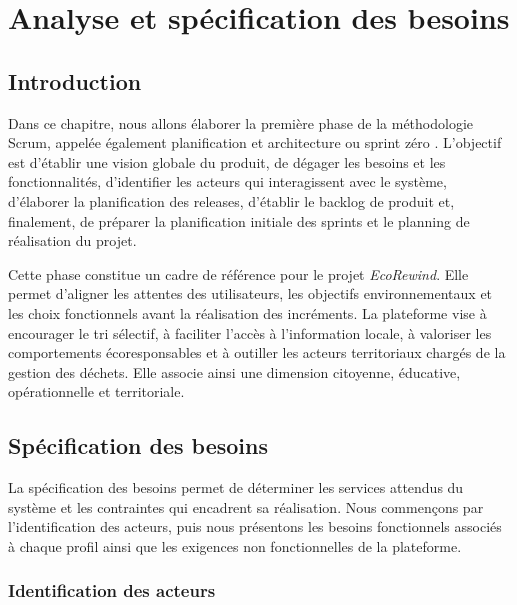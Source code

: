 \chapter{Analyse et spécification des besoins}
\label{chap:analyse_specification_besoins}

\section{Introduction}
\label{sec:introduction}

Dans ce chapitre, nous allons élaborer la première phase de la méthodologie Scrum, appelée également \og planification et architecture \fg{} ou \og sprint zéro \fg{}. L'objectif est d'établir une vision globale du produit, de dégager les besoins et les fonctionnalités, d'identifier les acteurs qui interagissent avec le système, d'élaborer la planification des releases, d'établir le backlog de produit et, finalement, de préparer la planification initiale des sprints et le planning de réalisation du projet.

Cette phase constitue un cadre de référence pour le projet \textit{EcoRewind}. Elle permet d'aligner les attentes des utilisateurs, les objectifs environnementaux et les choix fonctionnels avant la réalisation des incréments. La plateforme vise à encourager le tri sélectif, à faciliter l'accès à l'information locale, à valoriser les comportements écoresponsables et à outiller les acteurs territoriaux chargés de la gestion des déchets. Elle associe ainsi une dimension citoyenne, éducative, opérationnelle et territoriale.

\section{Spécification des besoins}
\label{sec:specification_besoins}

La spécification des besoins permet de déterminer les services attendus du système et les contraintes qui encadrent sa réalisation. Nous commençons par l'identification des acteurs, puis nous présentons les besoins fonctionnels associés à chaque profil ainsi que les exigences non fonctionnelles de la plateforme.

\subsection{Identification des acteurs}
\label{subsec:identification_acteurs}

